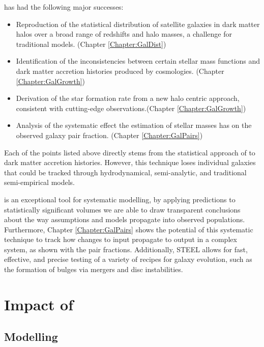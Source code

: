 \steel has had the following major successes:
\begin{itemize}
    \item Reproduction of the statistical distribution of satellite galaxies in dark matter halos over a broad range of redshifts and halo masses, a challenge for traditional \LCDM models. (Chapter \ref{Chapter:GalDist})
    \item Identification of the inconsistencies between certain stellar mass functions and dark matter accretion histories produced by \LCDM cosmologies. (Chapter \ref{Chapter:GalGrowth})
    \item Derivation of the star formation rate from a new halo centric approach, consistent with cutting-edge observations.(Chapter \ref{Chapter:GalGrowth})
    \item Analysis of the systematic effect the estimation of stellar masses has on the observed galaxy pair fraction. (Chapter \ref{Chapter:GalPairs})
\end{itemize}
Each of the points listed above directly stems from the statistical approach of \steel to dark matter accretion histories. However, this technique loses individual galaxies that could be tracked through hydrodynamical, semi-analytic, and traditional semi-empirical models.

\steel is an exceptional tool for systematic modelling, by applying predictions to statistically significant volumes we are able to draw transparent conclusions about the way assumptions and models propagate into observed populations. Furthermore, Chapter \ref{Chapter:GalPairs} shows the potential of this systematic technique to track how changes to input propagate to output in a complex system, as shown with the pair fractions. Additionally, STEEL allows for fast,  effective, and precise testing of a variety of recipes for galaxy evolution, such as the formation of bulges via mergers and disc instabilities.

\section{Impact of \steel}

\subsection{Modelling}

